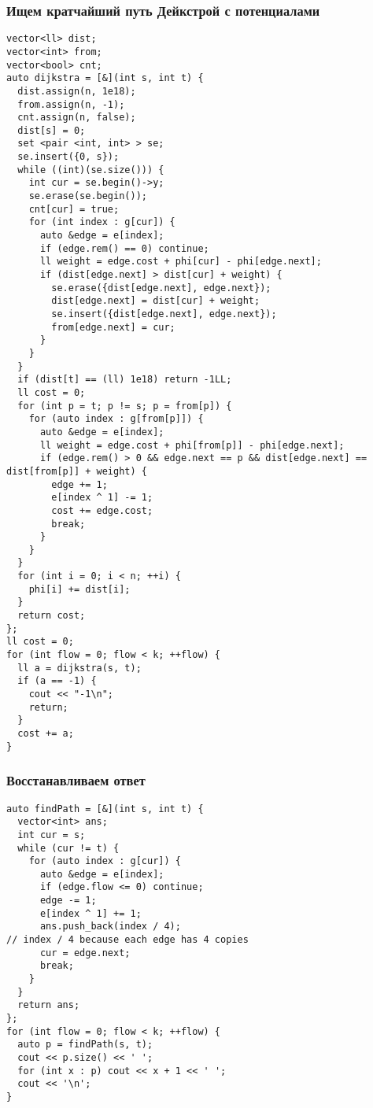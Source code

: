 \subsubsection{Ищем кратчайший путь Дейкстрой с потенциалами}
\begin{lstlisting}
vector<ll> dist;
vector<int> from;
vector<bool> cnt;
auto dijkstra = [&](int s, int t) {
  dist.assign(n, 1e18);
  from.assign(n, -1);
  cnt.assign(n, false);
  dist[s] = 0;
  set <pair <int, int> > se;
  se.insert({0, s});
  while ((int)(se.size())) {
    int cur = se.begin()->y;
    se.erase(se.begin());
    cnt[cur] = true;
    for (int index : g[cur]) {
      auto &edge = e[index];
      if (edge.rem() == 0) continue;
      ll weight = edge.cost + phi[cur] - phi[edge.next];
      if (dist[edge.next] > dist[cur] + weight) {
        se.erase({dist[edge.next], edge.next});
        dist[edge.next] = dist[cur] + weight;
        se.insert({dist[edge.next], edge.next});
        from[edge.next] = cur;
      }
    }
  }
  if (dist[t] == (ll) 1e18) return -1LL;
  ll cost = 0;
  for (int p = t; p != s; p = from[p]) {
    for (auto index : g[from[p]]) {
      auto &edge = e[index];
      ll weight = edge.cost + phi[from[p]] - phi[edge.next];
      if (edge.rem() > 0 && edge.next == p && dist[edge.next] == dist[from[p]] + weight) {
        edge += 1;
        e[index ^ 1] -= 1;
        cost += edge.cost;
        break;
      }
    }
  }
  for (int i = 0; i < n; ++i) {
    phi[i] += dist[i];
  }
  return cost;
};
ll cost = 0;
for (int flow = 0; flow < k; ++flow) {
  ll a = dijkstra(s, t);
  if (a == -1) {
    cout << "-1\n";
    return;
  }
  cost += a;
}
\end{lstlisting}
\subsubsection{Восстанавливаем ответ}
\begin{lstlisting}
auto findPath = [&](int s, int t) {
  vector<int> ans;
  int cur = s;
  while (cur != t) {
    for (auto index : g[cur]) {
      auto &edge = e[index];
      if (edge.flow <= 0) continue;
      edge -= 1;
      e[index ^ 1] += 1;
      ans.push_back(index / 4);
// index / 4 because each edge has 4 copies
      cur = edge.next;
      break;
    }
  }
  return ans;
};
for (int flow = 0; flow < k; ++flow) {
  auto p = findPath(s, t);
  cout << p.size() << ' ';
  for (int x : p) cout << x + 1 << ' ';
  cout << '\n';
}
\end{lstlisting}